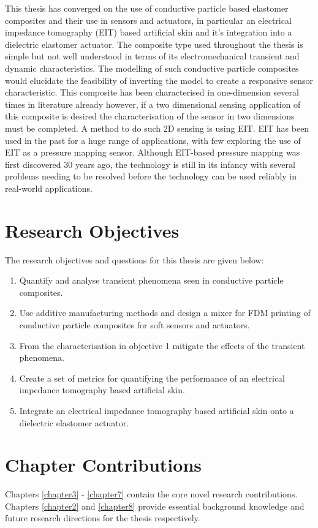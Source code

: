 This thesis has converged on the use of conductive particle based elastomer composites and their use in sensors and actuators, in particular an electrical impedance tomography (EIT) based artificial skin and it's integration into a dielectric elastomer actuator. The composite type used throughout the thesis is simple but not well understood in terms of its electromechanical transient and dynamic characteristics. The modelling of such conductive particle composites would elucidate the feasibility of inverting the model to create a responsive sensor characteristic. This composite has been characterised in one-dimension several times in literature already however, if a two dimensional sensing application of this composite is desired the characterisation of the sensor in two dimensions must be completed. A method to do such 2D sensing is using EIT. EIT has been used in the past for a huge range of applications, with few exploring the use of EIT as a pressure mapping sensor. Although EIT-based pressure mapping was first discovered 30 years ago, the technology is still in its infancy with several problems needing to be resolved before the technology can be used reliably in real-world applications.

\section{Research Objectives}
The research objectives and questions for this thesis are given below:
\begin{enumerate}
    \item Quantify and analyse transient phenomena seen in conductive particle composites.
    \item Use additive manufacturing methods and design a mixer for FDM printing of conductive particle composites for soft sensors and actuators.
    \item From the characterisation in objective 1 mitigate the effects of the transient phenomena.
    \item Create a set of metrics for quantifying the performance of an electrical impedance tomography based artificial skin.
    \item Integrate an electrical impedance tomography based artificial skin onto a dielectric elastomer actuator.
\end{enumerate}

\section{Chapter Contributions}
Chapters \ref{chapter3} - \ref{chapter7} contain the core novel research contributions. Chapters \ref{chapter2} and \ref{chapter8} provide essential background knowledge and future research directions for the thesis respectively.

